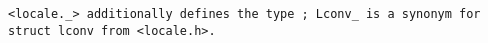 \tt{<locale._>} additionally defines the type ;
\tt{Lconv_} is a synonym for \tt{struct lconv} from \tt{<locale.h>}.
